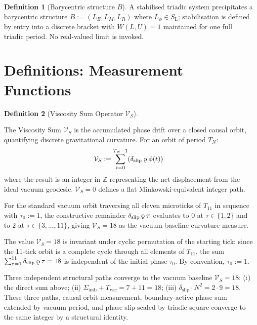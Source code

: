 \documentclass[11pt, letterpaper]{article}
\newcommand{\Z}{\mathbb{Z}}
\newcommand{\SL}{S_{\mathrm{L}}}
\newcommand{\koppa}{\mathbin{\text{\rm\k{o}}}}
\newcommand{\Tcyc}{T_{11}}
\newcommand{\Sigimb}{\Sigma_{\mathrm{imb}}}
\newcommand{\VS}{\mathcal{V}_S}
\theoremstyle{definition}
\newtheorem{definition}{Definition}[section]
\theoremstyle{plain}
\begin{document}
\begin{definition}[Barycentric structure $B$]\label{def:bary-struct}
A stabilised triadic system precipitates a barycentric structure
$B:=(L_E,L_M,L_R)$ where $L_\phi\in\SL$; stabilisation is defined by entry
into a discrete bracket with $W(L,U)=1$ maintained for one full triadic
period.  No real-valued limit is invoked.
\end{definition}

\newpage


\section{Definitions: Measurement Functions}\label{sec:measurement}

\begin{definition}[Viscosity Sum Operator $\VS$]\label{def:viscosity}
\begin{rsbox}
The Viscosity Sum $\VS$ is the accumulated phase drift over a closed causal
orbit, quantifying discrete gravitational curvature.  For an orbit of period
$T_N$:
\[
\VS := \sum_{t=0}^{T_N-1}(\delta_{\mathrm{slip}}\koppa\phi(t))
\]
where the result is an integer in $\Z$ representing the net displacement from
the ideal vacuum geodesic.  $\VS=0$ defines a flat Minkowski-equivalent
integer path.

For the standard vacuum orbit traversing all eleven microticks of $\Tcyc$ in
sequence with $\tau_0:=1$, the constructive remainder
$\delta_{\mathrm{slip}}\koppa\tau$ evaluates to $0$ at $\tau\in\{1,2\}$ and
to $2$ at $\tau\in\{3,\dots,11\}$, giving $\VS=18$ as the vacuum baseline
curvature measure.

The value $\VS=18$ is invariant under cyclic permutation of the starting
tick: since the 11-tick orbit is a complete cycle through all elements of
$\Tcyc$, the sum $\sum_{\tau=1}^{11}\delta_{\mathrm{slip}}\koppa\tau=18$ is
independent of the initial phase $\tau_0$.  By convention, $\tau_0:=1$.

\begin{observebox}
Three independent structural paths converge to the vacuum baseline $\VS=18$:
(i) the direct sum above; (ii) $\Sigimb+T_{\mathrm{vac}}=7+11=18$; (iii)
$\delta_{\mathrm{slip}}\cdot N^2=2\cdot 9=18$.  These three paths, causal
orbit measurement, boundary-active phase sum extended by vacuum period, and
phase slip scaled by triadic square converge to the same integer by a
structural identity.
\end{observebox}
\end{rsbox}
\end{definition}
\end{document}
